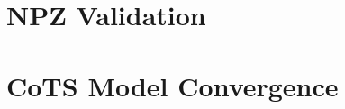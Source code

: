 \section{NPZ Validation}
\label{sec:npz_validation}




\section{CoTS Model Convergence}
\label{sec:convergence}

    
